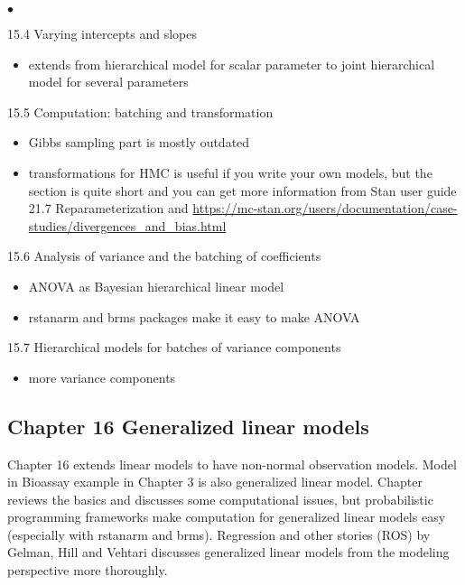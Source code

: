 \documentclass[a4paper,11pt]{article}
\begin{document}
\begin{list}{$\bullet$}{\parsep=0pt\itemsep=2pt}
  \item[15.4] Varying intercepts and slopes
    \begin{itemize}
    \item extends from hierarchical model for scalar parameter to
      joint hierarchical model for several parameters
    \end{itemize}
  \item[15.5] Computation: batching and transformation
    \begin{itemize}
    \item Gibbs sampling part is mostly outdated
    \item transformations for HMC is useful if you write your own
      models, but the section is quite short and you can get more
      information from Stan user guide 21.7 Reparameterization and
      \url{https://mc-stan.org/users/documentation/case-studies/divergences_and_bias.html}
    \end{itemize}
  \item[15.6] Analysis of variance and the batching of coefficients
    \begin{itemize}
    \item ANOVA as Bayesian hierarchical linear model
    \item rstanarm and brms packages make it easy to make ANOVA
    \end{itemize}
  \item[15.7] Hierarchical models for batches of variance components
    \begin{itemize}
    \item more variance components
    \end{itemize}
\end{list}

\subsection*{Chapter 16 Generalized linear models}

Chapter 16 extends linear models to have non-normal observation
models. Model in Bioassay example in Chapter 3 is also generalized
linear model. Chapter reviews the basics and discusses some
computational issues, but probabilistic programming frameworks make
computation for generalized linear models easy (especially with
rstanarm and brms). Regression and other stories (ROS) by Gelman, Hill
and Vehtari discusses generalized linear models from the modeling
perspective more thoroughly.
\end{document}
